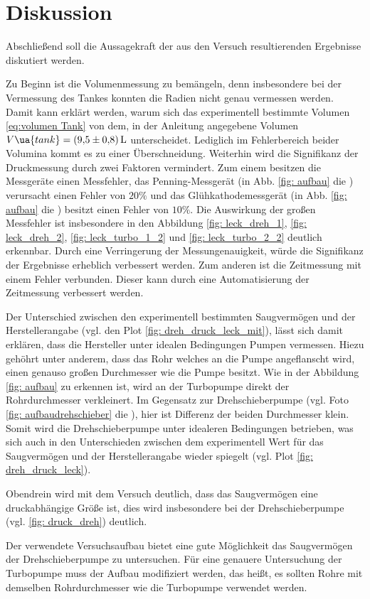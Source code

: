 \section{Diskussion}

Abschließend soll die Aussagekraft der aus den Versuch resultierenden Ergebnisse diskutiert werden.

Zu Beginn ist die Volumenmessung zu bemängeln, denn insbesondere bei der Vermessung des Tankes
konnten die Radien nicht genau vermessen werden. Damit kann erklärt werden, warum sich das experimentell
bestimmte Volumen \eqref{eq:volumen Tank} von dem, in der Anleitung \cite{} angegebene Volumen
$V\ua{tank}=\SI{9.5\pm0,8}{\litre}$ unterscheidet. Lediglich im Fehlerbereich beider Volumina
kommt es zu einer Überschneidung.
Weiterhin wird die Signifikanz der Druckmessung durch zwei Faktoren vermindert.
Zum einem besitzen die Messgeräte einen Messfehler, das Penning-Messgerät (in Abb. \ref{fig: aufbau} die ) verursacht einen Fehler von $20\%$ und das
Glühkathodemessgerät (in Abb. \ref{fig: aufbau} die ) besitzt einen Fehler von $10\%$. Die Auswirkung der großen Messfehler
ist insbesondere in den Abbildung \ref{fig: leck_dreh_1}, \ref{fig: leck_dreh_2}, \ref{fig: leck_turbo_1_2} und \ref{fig: leck_turbo_2_2} deutlich erkennbar.
Durch eine Verringerung der Messungenauigkeit, würde die Signifikanz der Ergebnisse erheblich verbessert werden.
Zum anderen ist die Zeitmessung mit einem Fehler verbunden. Dieser kann durch eine Automatisierung der Zeitmessung verbessert werden.

Der Unterschied zwischen den experimentell bestimmten Saugvermögen und der Herstellerangabe (vgl. den Plot \ref{fig: dreh_druck_leck_mit}),
lässt sich damit erklären, dass die Hersteller unter idealen Bedingungen Pumpen vermessen. Hiezu gehöhrt unter anderem, dass das Rohr welches an die Pumpe angeflanscht wird,
einen genauso großen Durchmesser wie die Pumpe besitzt. Wie in der Abbildung \ref{fig: aufbau} zu erkennen ist, wird an der Turbopumpe  direkt der
Rohrdurchmesser verkleinert. Im Gegensatz zur Drehschieberpumpe (vgl. Foto \ref{fig: aufbaudrehschieber} die ),
hier ist Differenz der beiden Durchmesser klein. Somit wird die Drehschieberpumpe unter idealeren Bedingungen betrieben, was sich auch in den
Unterschieden zwischen dem experimentell Wert für das Saugvermögen und der Herstellerangabe wieder spiegelt (vgl. Plot \ref{fig: dreh_druck_leck}).

Obendrein wird mit dem Versuch deutlich, dass das Saugvermögen eine druckabhängige Größe ist, dies wird insbesondere
bei der Drehschieberpumpe (vgl. \ref{fig: druck_dreh}) deutlich.

Der verwendete Versuchsaufbau bietet eine gute Möglichkeit das Saugvermögen der Drehschieberpumpe zu untersuchen.
Für eine genauere Untersuchung der Turbopumpe muss der Aufbau modifiziert werden, das heißt, es sollten Rohre mit
demselben Rohrdurchmesser wie die Turbopumpe verwendet werden.
